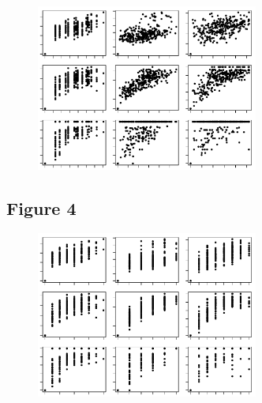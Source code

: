 \documentclass[12pt]{article}
\begin{document}
\begin{figure}[ht!]
	\centering\includegraphics[width=0.65\textwidth]{BetaGeoDist.pdf}
\end{figure}

\newpage

\subsection*{Figure 4}

\begin{figure}[ht!]
	\centering\includegraphics[width=0.65\textwidth]{BetaTopoDist.pdf}
\end{figure}

\newpage

\end{document}
